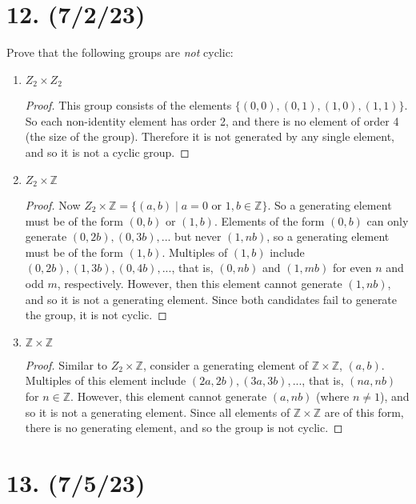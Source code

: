 \documentclass{article}
\begin{document}
\section*{12. (7/2/23)}

Prove that the following groups are \emph{not} cyclic:

\begin{enumerate}[label=(\alph*), itemsep=0em]
    \item $Z_2 \times Z_2$
          \begin{proof}
            This group consists of the elements $\{ (0, 0), (0, 1), (1, 0), (1, 1) \}$. So each non-identity element has order 2, and there is no element of order 4 (the size of the group). Therefore it is not generated by any single element, and so it is not a cyclic group.
          \end{proof}
    \item $Z_2 \times \mathbb{Z}$
          \begin{proof}
            Now $Z_2 \times \mathbb{Z} = \{ (a, b) \mid a = 0 \text{ or } 1, b \in \mathbb{Z} \}$. So a generating element must be of the form $(0, b)$ or $(1, b)$. Elements of the form $(0, b)$ can only generate $(0, 2b), (0, 3b), ...$ but never $(1, nb)$, so a generating element must be of the form $(1, b)$. Multiples of $(1, b)$ include $(0, 2b), (1, 3b), (0, 4b), ...$, that is, $(0, nb)$ and $(1, mb)$ for even $n$ and odd $m$, respectively. However, then this element cannot generate $(1, nb)$, and so it is not a generating element. Since both candidates fail to generate the group, it is not cyclic.
          \end{proof}
    \item $\mathbb{Z} \times \mathbb{Z}$
          \begin{proof}
            Similar to $Z_2 \times \mathbb{Z}$, consider a generating element of $\mathbb{Z} \times \mathbb{Z}$, $(a, b)$. Multiples of this element include $(2a, 2b), (3a, 3b), ...$, that is, $(na, nb)$ for $n \in \mathbb{Z}$. However, this element cannot generate $(a, nb)$ (where $n \neq 1$), and so it is not a generating element. Since all elements of $\mathbb{Z} \times \mathbb{Z}$ are of this form, there is no generating element, and so the group is not cyclic.
          \end{proof}
\end{enumerate}

\section*{13. (7/5/23)}
\end{document}
